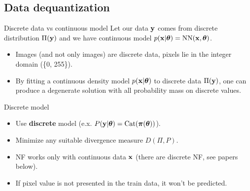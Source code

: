 \documentclass{beamer}
\begin{document}
\subsection{Data dequantization}
\begin{frame}{Discrete data vs continuous model}
	Let our data $\mathbf{y}$ comes from discrete distribution $\Pi(\mathbf{y})$ and we have continuous model $p(\mathbf{x} | \boldsymbol{\theta}) = \text{NN}(\mathbf{x}, \boldsymbol{\theta})$.
	\begin{itemize}
		\item Images {\color{gray}(and not only images)} are discrete data, pixels lie in the integer domain (\{0, 255\}). 
		\item By fitting a continuous density model $p(\mathbf{x} | \boldsymbol{\theta})$ to discrete data $\Pi(\mathbf{y})$, one can produce a degenerate solution with all probability mass on discrete values. 
	\end{itemize}
	\begin{block}{Discrete model}
		\begin{itemize}
			\item Use \textbf{discrete} model (e.x. $P(\mathbf{y} | \boldsymbol{\theta}) = \text{Cat}(\boldsymbol{\pi}(\boldsymbol{\theta}))$). 
			\item Minimize any suitable divergence measure $D(\Pi, P)$.
			\item NF works only with continuous data $\mathbf{x}$ (there are discrete NF, see papers below).
			\item If pixel value is not presented in the train data, it won't be predicted.		
		\end{itemize}
	\end{block}
\end{frame}
\end{document}
